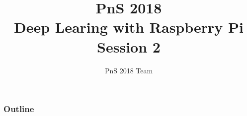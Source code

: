 \documentclass{beamer}
\title[PnS2018]{\textbf{PnS 2018} \\
\textbf{\normalsize Deep Learing with Raspberry Pi}\\
\normalsize Session 2}
\author{PnS 2018 Team}
\institute[INI-UZH/ETHz]{Institute of Neuroinformatics \\
University of Z\"urich and ETH Z\"urich}
\date{}
\begin{document}
\titlepage

\begin{frame}
\frametitle{Outline}

\tableofcontents
\end{frame}



%
%
%
%
\end{document}
